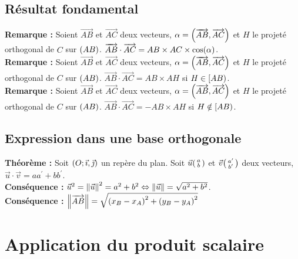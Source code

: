 \documentclass[a4paper,titlepage]{article}
\let\oldsection\section
\renewcommand\section{\clearpage\oldsection}
\let\oldleft\left
\renewcommand{\left}{\mathopen{}\mathclose\bgroup\oldleft}
\let\oldright\right
\renewcommand{\right}{\aftergroup\egroup\oldright}
\begin{document}
    \subsection{Résultat fondamental}
        \textbf{Remarque :} Soient $\overrightarrow{AB}$ et $\overrightarrow{AC}$ deux vecteurs, $\alpha=\left(\overrightarrow{AB},\overrightarrow{AC}\right)$ et $H$ le projeté orthogonal de $C$ sur $\left(AB\right)$. $\overrightarrow{AB}\cdot\overrightarrow{AC}=AB\times AC\times\cos\left(\alpha\right)$.
        \\
        \textbf{Remarque :} Soient $\overrightarrow{AB}$ et $\overrightarrow{AC}$ deux vecteurs, $\alpha=\left(\overrightarrow{AB},\overrightarrow{AC}\right)$ et $H$ le projeté orthogonal de $C$ sur $\left(AB\right)$. $\overrightarrow{AB}\cdot\overrightarrow{AC}=AB\times AH$ si $H\in\left[AB\right)$.
        \\
        \textbf{Remarque :} Soient $\overrightarrow{AB}$ et $\overrightarrow{AC}$ deux vecteurs, $\alpha=\left(\overrightarrow{AB},\overrightarrow{AC}\right)$ et $H$ le projeté orthogonal de $C$ sur $\left(AB\right)$. $\overrightarrow{AB}\cdot\overrightarrow{AC}=-AB\times AH$ si $H\notin\left[AB\right)$.
    \subsection{Expression dans une base orthogonale}
        \textbf{Théorème :} Soit $\left(O;\vec{\imath},\vec{\jmath}\right)$ un repère du plan. Soit $\vec{u}\left(\begin{smallmatrix}a\\b\end{smallmatrix}\right)$ et $\vec{v}\left(\begin{smallmatrix}a^{\prime}\\b^{\prime}\end{smallmatrix}\right)$ deux vecteurs, $\vec{u}\cdot\vec{v}=aa^{\prime}+bb^{\prime}$.
        \\
        \textbf{Conséquence :} $\vec{u}^{2}=\left\|\vec{u}\right\|^{2}=a^{2}+b^{2}\Leftrightarrow\left\|\vec{u}\right\|=\sqrt{a^{2}+b^{2}}$.
        \\
        \textbf{Conséquence :} $\left\|\overrightarrow{AB}\right\|=\sqrt{\left(x_{B}-x_{A}\right)^{2}+\left(y_{B}-y_{A}\right)^{2}}$
\section{Application du produit scalaire}
\end{document}

